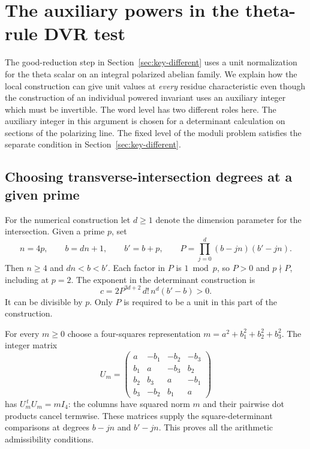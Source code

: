 \section{The auxiliary powers in the theta-rule DVR test}
\label{sec:key-rule-dvr}

The good-reduction step in Section~\ref{sec:key-different} uses a
unit normalization for the theta scalar on an integral polarized
abelian family. We explain how the local construction can give
unit values at \emph{every} residue characteristic even though
the construction of an individual powered invariant uses an
auxiliary integer which must be invertible. The word level has
two different roles here. The auxiliary integer in this argument
is chosen for a determinant calculation on sections of the
polarizing line. The fixed level of the moduli problem satisfies
the separate condition in Section~\ref{sec:key-different}.

\subsection{Choosing transverse-intersection degrees at a given prime}

For the numerical construction let \(d\geq1\) denote the dimension
parameter for the intersection. Given a prime \(p\), set
\[
       n=4p,\qquad b=dn+1,\qquad b'=b+p,\qquad
       P=\prod_{j=0}^d (b-jn)(b'-jn).
\]
Then \(n\ge4\) and \(dn<b<b'\). Each factor in \(P\) is \(1\bmod p\),
so \(P>0\) and \(p\nmid P\), including at \(p=2\). The exponent in
the determinant construction is
\[
     c=2P^{3d+2}\,d!\,n^d(b'-b)>0 .
\]
It can be divisible by \(p\). Only \(P\) is required to be a unit
in this part of the construction.

For every \(m\geq0\) choose a four-squares representation
\(m=a^2+b_1^2+b_2^2+b_3^2\). The integer matrix
\[
 U_m=
 \begin{pmatrix}
 a&-b_1&-b_2&-b_3\\
 b_1&a&-b_3&b_2\\
 b_2&b_3&a&-b_1\\
 b_3&-b_2&b_1&a
 \end{pmatrix}
\]
has \(U_m^{\,t}U_m=mI_4\): the columns have squared norm \(m\)
and their pairwise dot products cancel termwise. These matrices
supply the square-determinant comparisons at degrees \(b-jn\)
and \(b'-jn\). This proves all the arithmetic admissibility
conditions.

